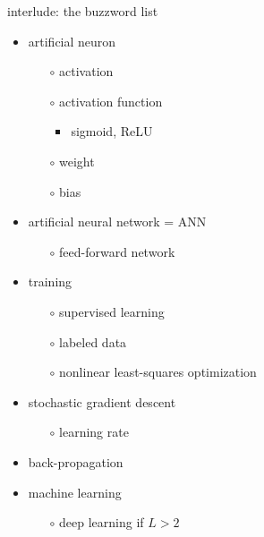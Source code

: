 \documentclass[xcolor={svgnames},
               hyperref={colorlinks,citecolor=DeepPink4,linkcolor=FireBrick,urlcolor=Maroon}]
               {beamer}
\begin{document}
\begin{frame}{interlude: the buzzword list}

\begin{itemize}
\item \alert{artificial neuron}
    \begin{itemize}
    \item[$\circ$] \alert{activation}
    \item[$\circ$] \alert{activation function}
        \begin{itemize}
        \item sigmoid, ReLU
        \end{itemize}
    \item[$\circ$] \alert{weight}
    \item[$\circ$] \alert{bias}
    \end{itemize}
\item \alert{artificial neural network} = ANN
    \begin{itemize}
    \item[$\circ$] feed-forward network
    \end{itemize}
\item \alert{training}
    \begin{itemize}
    \item[$\circ$] \alert{supervised learning}
    \item[$\circ$] labeled data
    \item[$\circ$] nonlinear least-squares optimization
    \end{itemize}
\item \alert{stochastic gradient descent}
    \begin{itemize}
    \item[$\circ$] learning rate
    \end{itemize}
\item \alert{back-propagation}

\hspace{-7mm} \hrulefill
\item \alert{machine learning}
    \begin{itemize}
    \item[$\circ$] \alert{deep learning} if $L>2$
    \end{itemize}
\end{itemize}
\end{frame}
\end{document}
